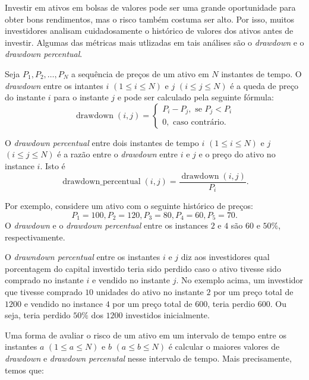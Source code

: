 Investir em ativos em bolsas de valores pode ser uma grande oportunidade para obter bons rendimentos, mas o risco também costuma ser alto.
Por isso, muitos investidores analisam cuidadosamente o histórico de valores dos ativos antes de investir.
Algumas das métricas mais utlizadas em tais análises são o \emph{drawdown} e o \emph{drawdown percentual}.

Seja $P_1, P_2, \ldots, P_N$ a sequência de preços de um ativo em $N$ instantes de tempo.
O \emph{drawdown} entre os intantes $i$ $(1 \leq i \leq N)$ e $j$ $(i \leq j \leq N)$ é a queda de preço do instante $i$ para o instante $j$ e
pode ser calculado pela seguinte fórmula:
\begin{equation*}
    \operatorname{drawdown}\left(i, j\right) = \begin{cases}
        P_i - P_j, \text{ se } P_j < P_i \\
        0, \text{ caso contrário.}
    \end{cases}
\end{equation*}

O \emph{drawdown percentual} entre dois instantes de tempo $i$ $(1 \leq i \leq N)$ e $j$ $(i \leq j \leq N)$ é a razão entre o \emph{drawdown} entre $i$ e $j$ e o preço do ativo no instance $i$. Isto é
\begin{equation*}
    \operatorname{drawdown\_percentual}\left(i, j\right) = \frac{\operatorname{drawdown}\left(i, j\right)}{P_i}. 
\end{equation*}

Por exemplo, considere um ativo com o seguinte histórico de preços:
\begin{equation*}
P_1 = 100, P_2 = 120, P_3 = 80, P_4 =  60, P_5 = 70.
\end{equation*}
O \emph{drawdown} e o \emph{drawdown percentual} entre os instances $2$ e $4$ são $60$ e $50\%$, respectivamente.

O \emph{drawndown percentual} entre os instantes $i$ e $j$ diz aos investidores qual porcentagem do capital investido teria sido perdido caso
o ativo tivesse sido comprado no instante $i$ e vendido no instante $j$. No exemplo acima, um investidor que tivesse comprado $10$ unidades do ativo no instante $2$ por um preço total de $1200$ e vendido no instance $4$ por um preço total de $600$, teria perdio $600$. Ou seja, teria perdido $50\%$ dos $1200$ investidos inicialmente.


Uma forma de avaliar o risco de um ativo em um intervalo de tempo entre os instantes $a$ $(1 \leq a \leq N)$ e $b$ $(a \leq b \leq N)$ é calcular o maiores valores de \emph{drawdown} e \emph{drawdown percenutal} nesse intervalo de tempo. Mais precisamente, temos que:

